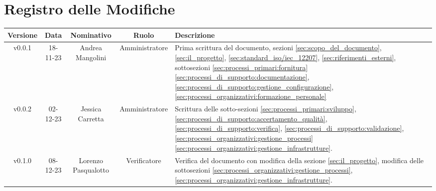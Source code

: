 \section*{\Large Registro delle Modifiche}
    \begin{table}[h]
        \centering
        \renewcommand\tabularxcolumn[1]{m{#1}} %
        \renewcommand{\arraystretch}{1.5}
        \begin{tabularx}{0.98\textwidth}
            {c|c|c|c|>{\centering\arraybackslash}X}
            \rowcolor{black}
            \textbf{\color{white} Versione} & \textbf{\color{white} Data} & \textbf{\color{white} Nominativo} & \textbf{\color{white} Ruolo} & \textbf{\color{white} Descrizione} \\ 
            \hline

            v0.0.1 & 18-11-23 & Andrea Mangolini & Amministratore & Prima scrittura del documento, sezioni \ref{sec:scopo_del_documento}, \ref{sec:il_progetto}, \ref{sec:standard_iso/iec_12207}, \ref{sec:riferimenti_esterni}, sottosezioni \ref{sec:processi_primari:fornitura} \ref{sec:processi_di_supporto:documentazione}, \ref{sec:processi_di_supporto:gestione_configurazione}, \ref{sec:processi_organizzativi:formazione_personale} \\

            v0.0.2 & 02-12-23 & Jessica Carretta & Amministratore & Scrittura delle sotto-sezioni \ref{sec:processi_primari:sviluppo}, \ref{sec:processi_di_supporto:accertamento_qualità}, \ref{sec:processi_di_supporto:verifica}, \ref{sec:processi_di_supporto:validazione}, \ref{sec:processi_organizzativi:gestione_processi}\ref{sec:processi_organizzativi:gestione_infrastrutture}. \\

            v0.1.0 & 08-12-23 & Lorenzo Pasqualotto & Verificatore & 
            Verifica del documento con modifica della sezione \ref{sec:il_progetto}, modifica delle sottosezioni
            \ref{sec:processi_organizzativi:gestione_processi},
            \ref{sec:processi_organizzativi:gestione_infrastrutture}.\\
            \hline
        \end{tabularx}
    \end{table}
